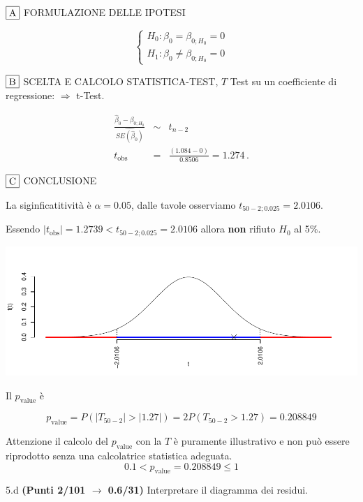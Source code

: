 \documentclass[
  11pt,
]{book}
\theoremstyle{mytheoremstyle}
\theoremstyle{mydefstyle}
\newenvironment{sol}
  {
  \begin{tcolorbox}[enhanced,breakable,arc=0.1mm,boxrule=1pt,colback=white,colframe=iblue,
  title=\bf \fontfamily{lmss}\selectfont \hspace{.5 cm} Soluzione,drop fuzzy shadow]

}{
\end{tcolorbox}
  }
\begin{document}
\begin{sol}
\(\fbox{A}\) FORMULAZIONE DELLE IPOTESI

\[\begin{cases}
   H_0: \beta_0 = \beta_{0;H_0}=0 \\
   H_1: \beta_0 \neq \beta_{0;H_0}=0 
   \end{cases}\]

\(\fbox{B}\) SCELTA E CALCOLO STATISTICA-TEST, \(T\)
Test su un coefficiente di regressione: \(\Rightarrow\) t-Test.

\begin{eqnarray*}
 \frac{\hat\beta_{ 0 } - \beta_{ 0 ;H_0}} {\widehat{SE(\hat\beta_{ 0 })}}&\sim&t_{n-2}\\
   t_{\text{obs}}
&=& \frac{ ( 1.084 -  0 )} { 0.8506 }
 =   1.274 \, .
\end{eqnarray*}

\(\fbox{C}\) CONCLUSIONE

La siginficatitività è \(\alpha=0.05\), dalle tavole osserviamo \(t_{50-2;0.025}=2.0106\).

Essendo \(|t_\text{obs}|=1.2739<t_{50-2;0.025}=2.0106\) allora \textbf{non} rifiuto \(H_0\) al 5\%.

\begin{center}\includegraphics{Esami_passati_con_soluzioni_files/figure-latex/2023-38,-1} \end{center}

Il \(p_{\text{value}}\) è

\[ p_{\text{value}} = P(|T_{50-2}|>|1.27|)=2P(T_{50-2}>1.27)=0.208849 \]

Attenzione il calcolo del \(p_\text{value}\) con la \(T\) è puramente illustrativo e non può essere riprodotto senza una calcolatrice statistica adeguata.\[
 0.1 < p_\text{value}= 0.208849 \leq 1 
\]

\end{sol}

5.d \textbf{(Punti 2/101 \(\rightarrow\) 0.6/31)} Interpretare il diagramma dei residui.
\end{document}
